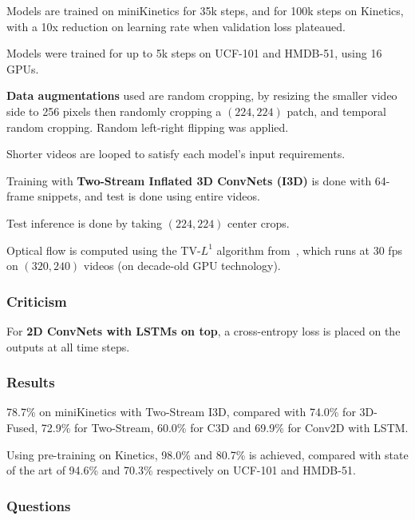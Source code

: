 \documentclass[a4paper, 12pt]{article}
\begin{document}
Models are trained on miniKinetics for 35k steps, and for 100k steps on
Kinetics, with a 10x reduction on learning rate when validation loss plateaued.

Models were trained for up to 5k steps on UCF-101 and HMDB-51, using 16 GPUs.

\textbf{Data augmentations} used are random cropping, by resizing the smaller
video side to 256 pixels then randomly cropping a $(224, 224)$ patch, and
temporal random cropping. Random left-right flipping was applied.

Shorter videos are looped to satisfy each model's input requirements.

Training with \textbf{Two-Stream Inflated 3D ConvNets (I3D)} is done with
64-frame snippets, and test is done using entire videos.

Test inference is done by taking $(224, 224)$ center crops.

Optical flow is computed using the TV-$L^1$ algorithm
from~\citet{Zach07aduality}, which runs at 30 fps on $(320, 240)$ videos (on
decade-old GPU technology).

\subsubsection{Criticism}

For \textbf{2D ConvNets with LSTMs on top}, a cross-entropy loss is placed on
the outputs at all time steps.

\subsubsection{Results}

78.7\% on miniKinetics with Two-Stream I3D, compared with 74.0\% for 3D-Fused,
72.9\% for Two-Stream, 60.0\% for C3D and 69.9\% for Conv2D with LSTM\@.

Using pre-training on Kinetics, 98.0\% and 80.7\% is achieved, compared with
state of the art of 94.6\% and 70.3\% respectively on UCF-101 and HMDB-51.


\subsubsection{Questions}
\end{document}
